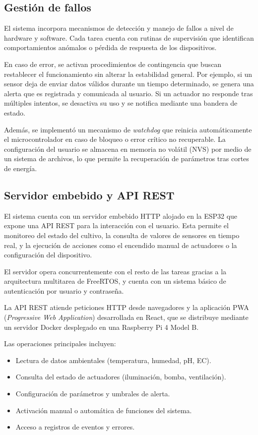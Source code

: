 \subsection{Gestión de fallos}
El sistema incorpora mecanismos de detección y manejo de fallos a nivel de hardware y software. Cada tarea cuenta con rutinas de supervisión que identifican comportamientos anómalos o pérdida de respuesta de los dispositivos.

En caso de error, se activan procedimientos de contingencia que buscan restablecer el funcionamiento sin alterar la estabilidad general. Por ejemplo, si un sensor deja de enviar datos válidos durante un tiempo determinado, se genera una alerta que es registrada y comunicada al usuario. Si un actuador no responde tras múltiples intentos, se desactiva su uso y se notifica mediante una bandera de estado.

Además, se implementó un mecanismo de \textit{watchdog} que reinicia automáticamente el microcontrolador en caso de bloqueo o error crítico no recuperable. La configuración del usuario se almacena en memoria no volátil (NVS) por medio de un sistema de archivos, lo que permite la recuperación de parámetros tras cortes de energía.

\subsection{Servidor embebido y API REST}
El sistema cuenta con un servidor embebido HTTP alojado en la ESP32 que expone una API REST para la interacción con el usuario. Esta permite el monitoreo del estado del cultivo, la consulta de valores de sensores en tiempo real, y la ejecución de acciones como el encendido manual de actuadores o la configuración del dispositivo.

El servidor opera concurrentemente con el resto de las tareas gracias a la arquitectura multitarea de FreeRTOS, y cuenta con un sistema básico de autenticación por usuario y contraseña.

La API REST atiende peticiones HTTP desde navegadores y la aplicación PWA (\textit{Progressive Web Application}) desarrollada en React, que se distribuye mediante un servidor Docker desplegado en una Raspberry Pi 4 Model B.

Las operaciones principales incluyen:
\begin{itemize}
    \item Lectura de datos ambientales (temperatura, humedad, pH, EC).
    \item Consulta del estado de actuadores (iluminación, bomba, ventilación).
    \item Configuración de parámetros y umbrales de alerta.
    \item Activación manual o automática de funciones del sistema.
    \item Acceso a registros de eventos y errores.
\end{itemize}

